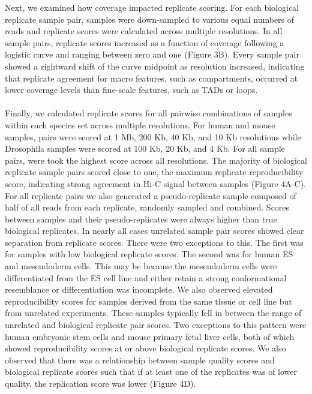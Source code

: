 
Next, we examined how coverage impacted replicate scoring. For each biological replicate sample pair, samples were down-sampled to various equal numbers of reads and replicate scores were calculated across multiple resolutions. In all sample pairs, replicate scores increased as a function of coverage following a logistic curve and ranging between zero and one (Figure 3B). Every sample pair showed a rightward shift of the curve midpoint as resolution increased, indicating that replicate agreement for macro features, such as compartments, occurred at lower coverage levels than fine-scale features, such as TADs or loops.
\\\\
Finally, we calculated replicate scores for all pairwise combinations of samples within each species set across multiple resolutions. For human and mouse samples, pairs were scored at 1 Mb, 200 Kb, 40 Kb, and 10 Kb resolutions while Drosophila samples were scored at 100 Kb, 20 Kb, and 4 Kb. For all sample pairs, were took the highest score across all resolutions. The majority of biological replicate sample pairs scored close to one, the maximum replicate reproducibility score, indicating strong agreement in Hi-C signal between samples (Figure 4A-C). For all replicate pairs we also generated a pseudo-replicate sample composed of half of all reads from each replicate, randomly sampled and combined. Scores between samples and their pseudo-replicates were always higher than true biological replicates. In nearly all cases unrelated sample pair scores showed clear separation from replicate scores. There were two exceptions to this. The first was for samples with low biological replicate scores. The second was for human ES and mesendoderm cells. This may be because the mesendoderm cells were differentiated from the ES cell line and either retain a strong conformational resemblance or differentiation was incomplete. We also observed elevated reproducibility scores for samples derived from the same tissue or cell line but from unrelated experiments. These samples typically fell in between the range of unrelated and biological replicate pair scores. Two exceptions to this pattern were human embryonic stem cells and mouse primary fetal liver cells, both of which showed reproducibility scores at or above biological replicate scores. We also observed that there was a relationship between sample quality scores and biological replicate scores such that if at least one of the replicates was of lower quality, the replication score was lower (Figure 4D).


